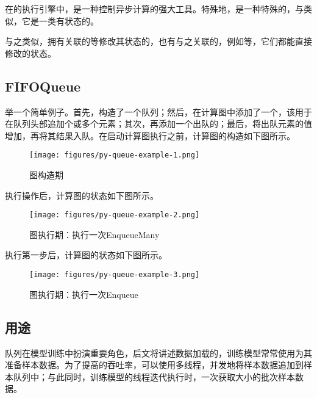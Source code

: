 \begin{content}

在的执行引擎中，是一种控制异步计算的强大工具。特殊地，是一种特殊的，与类似，它是一类有状态的。

与之类似，拥有关联的等修改其状态的，也有与之关联的，例如等，它们都能直接修改的状态。

\subsection{FIFOQueue}

举一个简单例子。首先，构造了一个队列；然后，在计算图中添加了一个，该用于在队列头部追加个或多个元素；其次，再添加一个出队的；最后，将出队元素的值增加，再将其结果入队。在启动计算图执行之前，计算图的构造如下图所示。

\begin{figure}[!h]
\centering
\texttt{[image: figures/py-queue-example-1.png]}
\caption{图构造期}
 \label{fig:py-queue-example-1}
\end{figure}

执行操作后，计算图的状态如下图所示。

\begin{figure}[!h]
\centering
\texttt{[image: figures/py-queue-example-2.png]}
\caption{图执行期：执行一次EnqueueMany}
 \label{fig:py-queue-example-2}
\end{figure}


执行第一步后，计算图的状态如下图所示。

\begin{figure}[!h]
\centering
\texttt{[image: figures/py-queue-example-3.png]}
\caption{图执行期：执行一次Enqueue}
 \label{fig:py-queue-example-3}
\end{figure}

\subsection{用途}

队列在模型训练中扮演重要角色，后文将讲述数据加载的，训练模型常常使用为其准备样本数据。为了提高的吞吐率，可以使用多线程，并发地将样本数据追加到样本队列中；与此同时，训练模型的线程迭代执行时，一次获取大小的批次样本数据。


\end{content}
